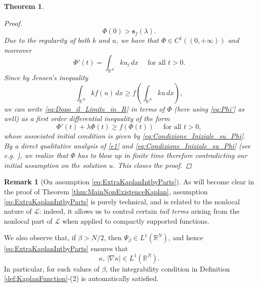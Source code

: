 \documentclass[11pt,a4paper,reqno]{amsart}
\def \LL {\mathcal{L}}
\theoremstyle{definition}
\newtheorem{remark}[definition]{Remark}
\theoremstyle{plain}
\newtheorem{theorem}[definition]{Theorem}
\numberwithin{equation}{section}
\begin{document}
\begin{theorem}
\begin{proof}
\begin{equation}\label{eq:Condizione_Iniziale_su_Phi}
	\Phi(0)> \mathbf{s}_f(\lambda).
\end{equation}
Due to the regularity of both $k$ and $u$, we have that $\Phi \in C^{1}((0,+\infty))$ and moreover
\begin{equation}\label{eq:Phi'}
	\Phi'(t) = \int_{\mathbb{R}^{N}}k u_t \, dx \quad \textrm{ for all } t>0.
\end{equation}
Since by Jensen's inequality
\begin{equation}\label{eq:usando_Jensen}
	\int_{\mathbb{R}^{N}}k f(u)\, dx \geq f\left(\int_{\mathbb{R}^{N}}k u \, dx \right),
\end{equation}
\noindent we can write \eqref{eq:Dopo_il_Limite_in_R} in terms of $\Phi$ (here using \eqref{eq:Phi'} as well) as a first order differential inequality of the form
\begin{equation}\label{e1}
	\Phi'(t) + \lambda \Phi(t) \geq f(\Phi(t))\quad \textrm{ for all } t >0,
\end{equation}
\noindent whose associated initial condition is given by \eqref{eq:Condizione_Iniziale_su_Phi}. By a direct qualitative analysis of \eqref{e1} and \eqref{eq:Condizione_Iniziale_su_Phi} (see e.g. \cite[Lemma 5.3]{PZ1}), we realize that $\Phi$ has to blow up in finite time therefore contradicting our initial assumption on the solution $u$. This closes the proof.
\end{proof}
\end{theorem}


\begin{remark}[On assumption \eqref{eq:ExtraKaplanIntbyParts}] \label{rem:OnEstimatekappa}
As will become clear in the proof of Theorem \ref{thm:MainNonExistenceKaplan}, assum\-ption \eqref{eq:ExtraKaplanIntbyParts} is purely technical, and is
related to the nonlocal nature of $\LL$: indeed, it allows us to control certain \emph{tail terms} arising from the nonlocal part of $\LL$ when applied to compactly supported functions. %

\vspace{0.1cm}

We also observe that, if $\beta > {N}/{2}$, then $\Psi_\beta\in L^1(\mathbb{R}^N)$, and hence \eqref{eq:ExtraKaplanIntbyParts} ensures that
$$\kappa,\,|\nabla\kappa|\in L^1(\mathbb{R}^N).$$
In particular, for such values of $\beta$, the integrability condition in Definition \ref{def:KaplanFunction}-(2) is automa\-tically satisfied.
\end{remark}
\end{document}
